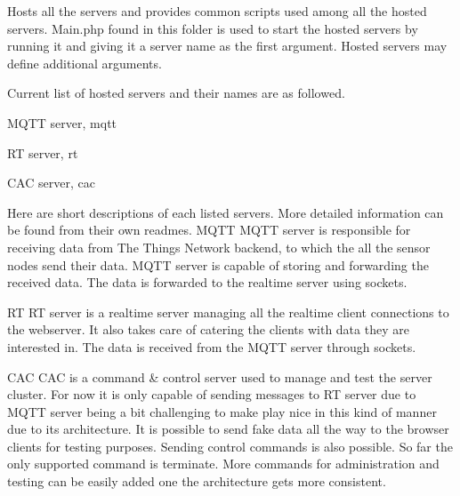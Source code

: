 Hosts all the servers and provides common scripts used among all the hosted servers. Main.\+php found in this folder is used to start the hosted servers by running it and giving it a server name as the first argument. Hosted servers may define additional arguments.

Current list of hosted servers and their names are as followed.
\begin{DoxyItemize}
\item M\+Q\+TT server, mqtt
\item RT server, rt
\item C\+AC server, cac
\end{DoxyItemize}

Here are short descriptions of each listed servers. More detailed information can be found from their own readmes. M\+Q\+TT M\+Q\+TT server is responsible for receiving data from The Things Network backend, to which the all the sensor nodes send their data. M\+Q\+TT server is capable of storing and forwarding the received data. The data is forwarded to the realtime server using sockets.

RT RT server is a realtime server managing all the realtime client connections to the webserver. It also takes care of catering the clients with data they are interested in. The data is received from the M\+Q\+TT server through sockets.

C\+AC C\+AC is a command \& control server used to manage and test the server cluster. For now it is only capable of sending messages to RT server due to M\+Q\+TT server being a bit challenging to make play nice in this kind of manner due to its architecture. It is possible to send fake data all the way to the browser clients for testing purposes. Sending control commands is also possible. So far the only supported command is terminate. More commands for administration and testing can be easily added one the architecture gets more consistent. 